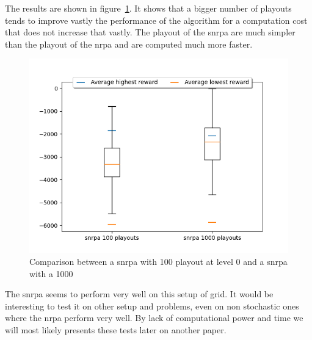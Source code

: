 The results are shown in figure~\ref{fig:results_snrpa_playout}.
It shows that a bigger number of playouts tends to improve vastly the performance of the algorithm for a computation cost that does not increase that vastly.
The playout of the \gls{snrpa} are much simpler than the playout of the \gls{nrpa} and are computed much more faster.

\begin{figure}[htpb]
    \centering
    \includegraphics[width=0.8\linewidth]{./src/figures/moustache_snrpa.png}
    \caption{Comparison between a \gls{snrpa} with 100 playout at level 0 and a \gls{snrpa} with a 1000}
    \label{fig:results_snrpa_playout}
\end{figure}

The \gls{snrpa} seems to perform very well on this setup of grid.
It would be interesting to test it on other setup and problems, even on non stochastic ones where the \gls{nrpa} perform very well.
By lack of computational power and time we will most likely presents these tests later on another paper.


